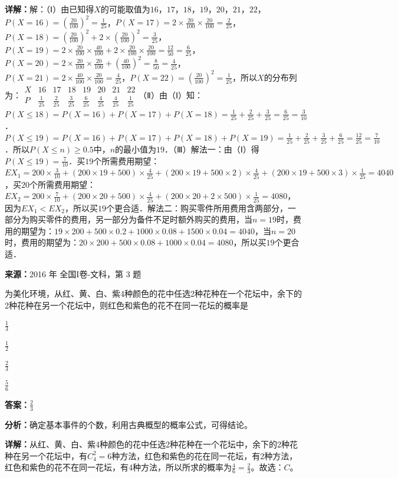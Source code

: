\begin{question}[points=12]
\begin{solution}
\textbf{详解：}解：（Ⅰ）由已知得$X$的可能取值为$16$，$17$，$18$，$19$，$20$，$21$，$22$，$P(X=16)=(\frac{20}{100})^2=\frac{1}{25}$，$P(X=17)=2\times\frac{20}{100}\times\frac{20}{100}=\frac{2}{25}$，$P(X=18)=(\frac{20}{100})^2+2\times(\frac{20}{100})^2=\frac{3}{25}$，$P(X=19)=2\times\frac{20}{100}\times\frac{40}{100}+2\times\frac{20}{100}\times\frac{20}{100}=\frac{12}{50}=\frac{6}{25}$，$P(X=20)=2\times\frac{20}{100}\times\frac{20}{100}+(\frac{40}{100})^2=\frac{8}{50}=\frac{4}{25}$，$P(X=21)=2\times\frac{40}{100}\times\frac{20}{100}=\frac{4}{25}$，$P(X=22)=(\frac{20}{100})^2=\frac{1}{25}$，所以$X$的分布列为：$\begin{array}{c|ccccccc} X & 16 & 17 & 18 & 19 & 20 & 21 & 22 \\ \hline P & \frac{1}{25} & \frac{2}{25} & \frac{3}{25} & \frac{6}{25} & \frac{4}{25} & \frac{4}{25} & \frac{1}{25} \end{array}$（Ⅱ）由（Ⅰ）知：$P(X\le18)=P(X=16)+P(X=17)+P(X=18)=\frac{1}{25}+\frac{2}{25}+\frac{3}{25}=\frac{6}{25}=\frac{3}{10}$．$P(X\le19)=P(X=16)+P(X=17)+P(X=18)+P(X=19)=\frac{1}{25}+\frac{2}{25}+\frac{3}{25}+\frac{6}{25}=\frac{12}{25}=\frac{7}{10}$．所以$P(X\le n)\ge0.5$中，$n$的最小值为$19$．（Ⅲ）解法一：由（Ⅰ）得$P(X\le19)=\frac{7}{10}$．买$19$个所需费用期望：$EX_1=200\times\frac{3}{10}+(200\times19+500)\times\frac{4}{25}+(200\times19+500\times2)\times\frac{4}{25}+(200\times19+500\times3)\times\frac{1}{25}=4040$，买$20$个所需费用期望：$EX_2=200\times\frac{7}{10}+(200\times20+500)\times\frac{4}{25}+(200\times20+2\times500)\times\frac{1}{25}=4080$，因为$EX_1<EX_2$，所以买$19$个更合适．解法二：购买零件所用费用含两部分，一部分为购买零件的费用，另一部分为备件不足时额外购买的费用，当$n=19$时，费用的期望为：$19\times200+500\times0.2+1000\times0.08+1500\times0.04=4040$，当$n=20$时，费用的期望为：$20\times200+500\times0.08+1000\times0.04=4080$，所以买$19$个更合适．
\end{solution}
\end{question}

\begin{question}[points=5]
\textbf{来源：}2016 年 全国I卷-文科，第 3 题\par
为美化环境，从红、黄、白、紫4种颜色的花中任选2种花种在一个花坛中，余下的2种花种在另一个花坛中，则红色和紫色的花不在同一花坛的概率是
\begin{choices}
  \item $\frac{1}{3}$
  \item $\frac{1}{2}$
  \item $\frac{2}{3}$
  \item $\frac{5}{6}$
\end{choices}
\begin{solution}
\textbf{答案：}$\frac{2}{3}$

\textbf{分析：}确定基本事件的个数，利用古典概型的概率公式，可得结论。

\textbf{详解：}从红、黄、白、紫4种颜色的花中任选2种花种在一个花坛中，余下的2种花种在另一个花坛中，有$C_4^2=6$种方法，红色和紫色的花在同一花坛，有2种方法，红色和紫色的花不在同一花坛，有4种方法，所以所求的概率为$\frac{4}{6}=\frac{2}{3}$。故选：$C$。
\end{solution}
\end{question}

